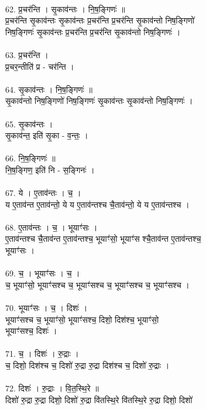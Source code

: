 \\
62. प्र॒चर॑न्ति । सृ॒काव॑न्तः । नि॒ष॒ङ्गिणः॑ ॥\\
प्र॒चर॑न्ति सृ॒काव॑न्तः सृ॒काव॑न्तः प्र॒चर॑न्ति प्र॒चर॑न्ति सृ॒काव॑न्तो निष॒ङ्गिणो॑\\
निष॒ङ्गिणः॑ सृ॒काव॑न्तः प्र॒चर॑न्ति प्र॒चर॑न्ति सृ॒काव॑न्तो निष॒ङ्गिणः॑ ।\\
\\
63. प्र॒चर॑न्ति ।\\
प्र॒चर॒न्तीति॑ प्र - चर॑न्ति ।\\
\\
64. सृ॒काव॑न्तः । नि॒ष॒ङ्गिणः॑ ॥\\
सृ॒काव॑न्तो निष॒ङ्गिणो॑ निष॒ङ्गिणः॑ सृ॒काव॑न्तः सृ॒काव॑न्तो निष॒ङ्गिणः॑ ।\\
\\
65. सृ॒काव॑न्तः ।\\
सृ॒काव॑न्त॒ इति॑ सृ॒का - व॒न्तः॒ ।\\
\\
66. नि॒ष॒ङ्गिणः॑ ॥\\
नि॒ष॒ङ्गिण॒ इति॑ नि - स॒ङ्गिनः॑ ।\\
\\
67. ये । ए॒ताव॑न्तः । च॒ ।\\
य ए॒ताव॑न्त ए॒ताव॑न्तो॒ ये य ए॒ताव॑न्तश्च चै॒ताव॑न्तो॒ ये य ए॒ताव॑न्तश्च ।\\
\\
68. ए॒ताव॑न्तः । च॒ । भूयाꣳ॑सः ।\\
ए॒ताव॑न्तश्च चै॒ताव॑न्त ए॒ताव॑न्तश्च॒ भूयाꣳ॑सो॒ भूयाꣳ॑स श्चै॒ताव॑न्त ए॒ताव॑न्तश्च॒\\
भूयाꣳ॑सः ।\\
\\
69. च॒ । भूयाꣳ॑सः । च॒ ।\\
च॒ भूयाꣳ॑सो॒ भूयाꣳ॑सश्च च॒ भूयाꣳ॑सश्च च॒ भूयाꣳ॑सश्च च॒ भूयाꣳ॑सश्च ।\\
\\
70. भूयाꣳ॑सः । च॒ । दिशः॑ ।\\
भूयाꣳ॑सश्च च॒ भूयाꣳ॑सो॒ भूयाꣳ॑सश्च॒ दिशो॒ दिश॑श्च॒ भूयाꣳ॑सो॒\\
भूयाꣳ॑सश्च॒ दिशः॑ ।\\
\\
71. च॒ । दिशः॑ । रु॒द्राः ।\\
च॒ दिशो॒ दिश॑श्च च॒ दिशो॑ रु॒द्रा रु॒द्रा दिश॑श्च च॒ दिशो॑ रु॒द्राः ।\\
\\
72. दिशः॑ । रु॒द्राः । वि॒त॒स्थि॒रे ॥\\
दिशो॑ रु॒द्रा रु॒द्रा दिशो॒ दिशो॑ रु॒द्रा वि॑तस्थि॒रे वि॑तस्थि॒रे रु॒द्रा दिशो॒ दिशो॑\\
